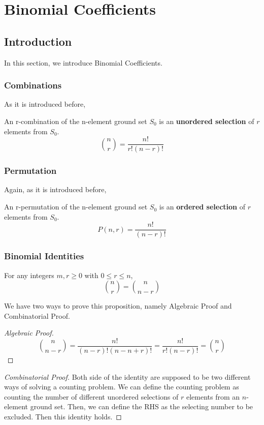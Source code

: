 \chapter{Binomial Coefficients}

\section{Introduction}
In this section, we introduce Binomial Coefficients.

\subsection{Combinations}
As it is introduced before,
\begin{definition} An r-combination of the n-element ground set $S_0$ is an \textbf{unordered selection} of $r$ elements from $S_0$. 
\[
	\binom{n}{r} = \dfrac{n!}{r!(n-r)!}
\]
\end{definition}

\subsection{Permutation}
Again, as it is introduced before, 
\begin{definition} An r-permutation of the n-element ground set $S_0$ is an \textbf{ordered selection} of $r$ elements from $S_0$. 
	\[
	P(n,r) = \dfrac{n!}{(n-r)!}
	\]
\end{definition}

\subsection{Binomial Identities}
\begin{proposition} For any integers \(m, r \geq 0\) with \(0 \leq r \leq n\),
	\[
		\binom{n}{r} = \binom{n}{n - r}
	\]
\end{proposition}

We have two ways to prove this proposition, namely Algebraic Proof and Combinatorial Proof.

\begin{proof}[Algebraic Proof]
	\[
		\binom{n}{n-r} = \dfrac{n!}{(n-r)!(n-n+r)!} = \dfrac{n!}{r!(n-r)!} = \binom{n}{r}
	\]
\end{proof}

\begin{proof}[Combinatorial Proof]
	Both side of the identity are supposed to be two different ways of solving a counting problem. We can define the counting problem as counting the number of different unordered selections of \(r\) elements from an \(n\)-element ground set. Then, we can define the RHS as the selecting number to be excluded. Then this identity holds.  
\end{proof}

